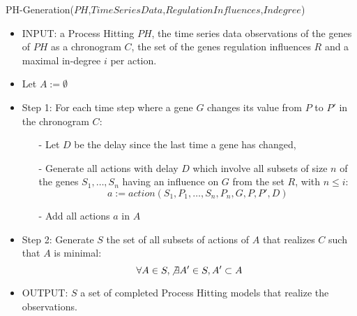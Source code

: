\begin{algorithm}
	\caption{PH-Generation($PH$,$Time Series Data$,$Regulation Influences$,$Indegree$)}
	\label{alg:PHG_ap}
	\begin{itemize}
		\item INPUT: a Process Hitting $PH$, the time series data observations of the genes of $PH$ as a chronogram $C$, the set of the genes regulation influences $R$ and a maximal in-degree $i$ per action.

		\item Let $A := \emptyset$
		\item Step 1: For each time step where a gene $G$ changes its value from $P$ to $P'$ in the chronogram $C$:

		\begin{itemize}
			\item[-] Let $D$ be the delay since the last time a gene has changed,
			\item[-] Generate all actions with delay $D$ which involve all subsets of size $n$ of the genes $S_1, \ldots, S_n$ having an influence on $G$ from the set $R$, with $n \leq i$:
			$$a := action(S_1,P_1,\ldots, S_n,P_n, G, P, P', D)$$
			\item[-] Add all actions $a$ in $A$
		\end{itemize}
		
		
		\item Step 2: Generate $S$ the set of all subsets of actions of $A$ that realizes $C$ such that $A$ is minimal:
			$$\forall A \in S, \not \exists A' \in S, A' \subset A$$
			
		\item OUTPUT: $S$ a set of completed Process Hitting models that realize the observations.
	\end{itemize}
\end{algorithm}

